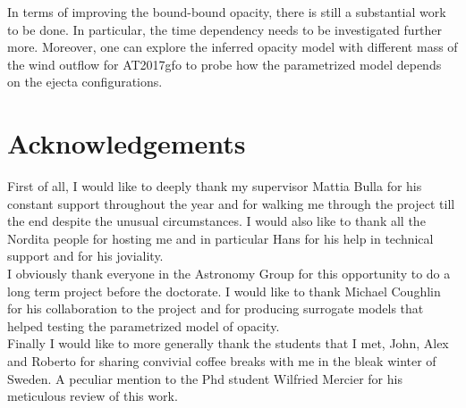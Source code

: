 \documentclass[a4paper, twoside, 11pt]{article}
\numberwithin{equation}{section}
\begin{document}
In terms of improving the bound-bound opacity, there is still a substantial work to be done. In particular, the time dependency needs to be investigated further more. Moreover, one can explore the inferred opacity  model with different mass of the wind outflow for AT2017gfo to probe how the parametrized model depends on the ejecta configurations. 
\section*{Acknowledgements}
\vspace{10pt}

\hspace{\parindent} First of all, I would like to deeply thank my supervisor Mattia Bulla for his constant support throughout the year and for walking me through the project till the end despite the unusual circumstances. I would also like to thank all the Nordita people for hosting me and in particular Hans for his help in technical support and for his joviality. \\

\indent I obviously thank everyone in the Astronomy Group for this opportunity to do a long term project before the doctorate. I would like to thank Michael Coughlin for his collaboration to the project and for producing surrogate models that helped testing the parametrized model of opacity. \\

\indent Finally I would like to more generally thank the students that I met, John, Alex and Roberto for sharing convivial coffee breaks with me in the bleak winter of Sweden.  A peculiar mention to the Phd student Wilfried Mercier for his meticulous review of this work. 
\clearpage

\begin{multicols}{2}

\end{multicols}
\clearpage
\appendix
\end{document}
